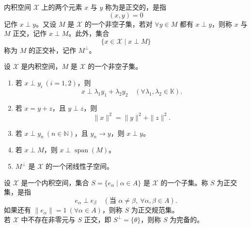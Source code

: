 \documentclass[lang=cn,newtx,10pt,scheme=chinese,thmcnt=chapter]{elegantbook}
\begin{document}
\begin{definition}[正交与正交补]
内积空间 $\mathscr{X}$ 上的两个元素 $x$ 与 $y$ 称为是正交的，是指
\begin{equation*}
(x, y) = 0
\end{equation*}
记作 $x \perp y$。又设 $M$ 是 $\mathscr{X}$ 的一个非空子集，若对 $\forall y \in M$ 都有 $x \perp y$，则称 $x$ 与 $M$ 正交，记作 $x \perp M$。此外，集合
\begin{equation*}
\{x \in \mathscr{X} \mid x \perp M\}
\end{equation*}
称为 $M$ 的正交补，记作 $M^{\perp}$。
\end{definition}

\begin{proposition}
设 $\mathscr{X}$ 是内积空间，$M$ 是 $\mathscr{X}$ 的一个非空子集。
\begin{enumerate}
    \item 若 $x \perp y_i \ (i=1,2)$，则
    \begin{equation*}
    x \perp \lambda_1 y_1 + \lambda_2 y_2 \quad (\forall \lambda_1, \lambda_2 \in \mathbb{K}).
    \end{equation*}
    \item 若 $x = y + z$，且 $y \perp z$，则
    \begin{equation*}
    \|x\|^2 = \|y\|^2 + \|z\|^2.
    \end{equation*}
    \item 若 $x \perp y_n \ (n \in \mathbb{N})$，且 $y_n \to y$，则 $x \perp y$。
    \item 若 $x \perp M$，则 $x \perp \operatorname{span}(M)$。
    \item $M^{\perp}$ 是 $\mathscr{X}$ 的一个闭线性子空间。
\end{enumerate}
\end{proposition}

\begin{definition}[正交集与完备正交集]
设 $\mathscr{X}$ 是一个内积空间，集合 $S = \{e_\alpha \mid \alpha \in A\}$ 是 $\mathscr{X}$ 的一个子集。称 $S$ 为正交集，是指
\begin{equation*}
e_\alpha \perp e_\beta \quad (\text{当 } \alpha \neq \beta, \ \forall \alpha, \beta \in A).
\end{equation*}
如果还有 $\|e_\alpha\| = 1 \ (\forall \alpha \in A)$，则称 $S$ 为正交规范集。\\
若 $\mathscr{X}$ 中不存在非零元与 $S$ 正交，即 $S^{\perp} = \{\theta\}$，则称 $S$ 为完备的。
\end{definition}
\end{document}
